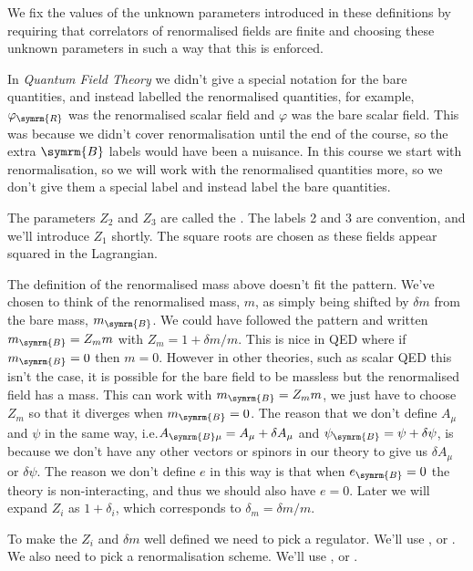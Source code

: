 \documentclass[fleqn]{NotesClass}
\newcommand*{\course}[1]{\textit{#1}}
\newcommand{\MSbar}{\ensuremath{\overline{\text{MS}}}}
\newcommand{\bare}{\symrm{B}}
\begin{document}
    We fix the values of the unknown parameters introduced in these definitions by requiring that correlators of renormalised fields are finite and choosing these unknown parameters in such a way that this is enforced.

    In \course{Quantum Field Theory} we didn't give a special notation for the bare quantities, and instead labelled the renormalised quantities, for example, \(\varphi_{\symrm{R}}\) was the renormalised scalar field and \(\varphi\) was the bare scalar field.
    This was because we didn't cover renormalisation until the end of the course, so the extra \(\bare\) labels would have been a nuisance.
    In this course we start with renormalisation, so we will work with the renormalised quantities more, so we don't give them a special label and instead label the bare quantities.
    
    The parameters \(Z_2\) and \(Z_3\) are called the .
    The labels 2 and 3 are convention, and we'll introduce \(Z_1\) shortly.
    The square roots are chosen as these fields appear squared in the Lagrangian.
    
    The definition of the renormalised mass above doesn't fit the pattern.
    We've chosen to think of the renormalised mass, \(m\), as simply being shifted by \(\delta m\) from the bare mass, \(m_{\bare}\).
    We could have followed the pattern and written \(m_{\bare} = Z_mm\) with \(Z_m = 1 + \delta m/m\).
    This is nice in QED where if \(m_{\bare} = 0\) then \(m = 0\).
    However in other theories, such as scalar QED this isn't the case, it is possible for the bare field to be massless but the renormalised field has a mass.
    This can work with \(m_{\bare} = Z_mm\), we just have to choose \(Z_m\) so that it diverges when \(m_{\bare} = 0\).
    The reason that we don't define \(A_\mu\) and \(\psi\) in the same way, i.e.\@ \(A_{\bare\mu} = A_{\mu} + \delta A_\mu\) and \(\psi_{\bare} = \psi + \delta \psi\), is because we don't have any other vectors or spinors in our theory to give us \(\delta A_\mu\) or \(\delta \psi\).
    The reason we don't define \(e\) in this way is that when \(e_{\bare} = 0\) the theory is non-interacting, and thus we should also have \(e = 0\).
    Later we will expand \(Z_i\) as \(1 + \delta_i\), which corresponds to \(\delta_m = \delta m/m\).
    
    To make the \(Z_i\) and \(\delta m\) well defined we need to pick a regulator.
    We'll use , or .
    We also need to pick a renormalisation scheme.
    We'll use , or \define{\MSbar}\index{MS@\MSbar}.
    
\end{document}
